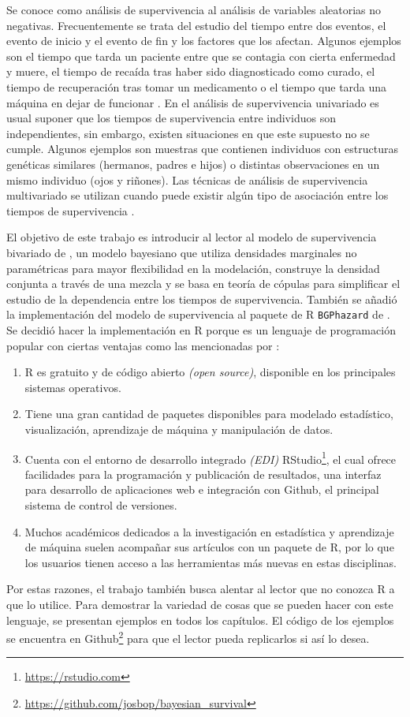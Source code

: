 \documentclass[11pt,a4paper]{article}
\begin{document}
Se conoce como análisis de supervivencia al análisis de variables aleatorias no negativas. Frecuentemente se trata del estudio del tiempo entre dos eventos, el evento de inicio y el evento de fin y los factores que los afectan. Algunos ejemplos son el tiempo que tarda un paciente entre que se contagia con cierta enfermedad y muere, el tiempo de recaída tras haber sido diagnosticado como curado, el tiempo de recuperación tras tomar un medicamento o el tiempo que tarda una máquina en dejar de funcionar \citep{moore}. En el análisis de supervivencia univariado es usual suponer que los tiempos de supervivencia entre individuos son independientes, sin embargo, existen situaciones en que este supuesto no se cumple. Algunos ejemplos son muestras que contienen individuos con estructuras genéticas similares (hermanos, padres e hijos) o distintas observaciones en un mismo individuo (ojos y riñones). Las técnicas de análisis de supervivencia multivariado se utilizan cuando puede existir algún tipo de asociación entre los tiempos de supervivencia \citep{klein}.

El objetivo de este trabajo es introducir al lector al modelo de supervivencia bivariado de \citet{nieto}, un modelo bayesiano que utiliza densidades marginales no paramétricas para mayor flexibilidad en la modelación, construye la densidad conjunta a través de una mezcla y se basa en teoría de cópulas para simplificar el estudio de la dependencia entre los tiempos de supervivencia. También se añadió la implementación del modelo de supervivencia al paquete de R \texttt{BGPhazard} de \citet{bgphazard}. Se decidió hacer la implementación en R porque es un lenguaje de programación popular con ciertas ventajas como las mencionadas por \citet{advanced_r}:
\begin{enumerate}
\item R es gratuito y de código abierto \textit{(open source)}, disponible en los principales sistemas operativos.
\item Tiene una gran cantidad de paquetes disponibles para modelado estadístico, visualización, aprendizaje de máquina y manipulación de datos.
\item Cuenta con el entorno de desarrollo integrado \textit{(EDI)} RStudio\footnote{\url{https://rstudio.com}}, el cual ofrece facilidades para la programación y publicación de resultados, una interfaz para desarrollo de aplicaciones web e integración con Github, el principal sistema de control de versiones.
\item Muchos académicos dedicados a la investigación en estadística y aprendizaje de máquina suelen acompañar sus artículos con un paquete de R, por lo que los usuarios tienen acceso a las herramientas más nuevas en estas disciplinas.
\end{enumerate}
Por estas razones, el trabajo también busca alentar al lector que no conozca R a que lo utilice. Para demostrar la variedad de cosas que se pueden hacer con este lenguaje, se presentan ejemplos en todos los capítulos. El código de los ejemplos se encuentra en Github\footnote{\url{https://github.com/josbop/bayesian_survival}} para que el lector pueda replicarlos si así lo desea.
\end{document}
